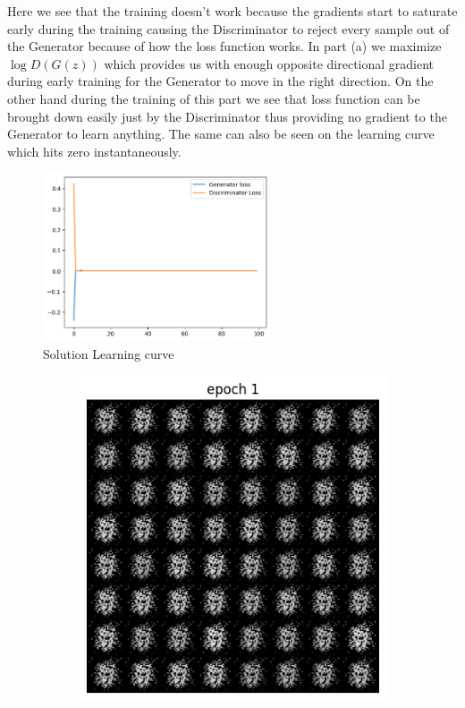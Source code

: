 \documentclass[a4paper]{article}
\theoremstyle{definition}
\newenvironment{soln}{
	\leavevmode\color{blue}\ignorespaces
}{}
\begin{document}
\begin{enumerate} [label=(\alph*)]
		\begin{soln}  
                Here we see that the training doesn't work because the gradients start to saturate early during the training causing the Discriminator to reject every sample out of the Generator because of how the loss function works. In part (a) we maximize $\log{D(G(z))}$ which provides us with enough opposite directional gradient during early training for the Generator to move in the right direction. On the other hand during the training of this part we see that loss function can be brought down easily just by the Discriminator thus providing no gradient to the Generator to learn anything. The same can also be seen on the learning curve which hits zero instantaneously. 
                \begin{figure}[H]
    			\centering
    			\includegraphics[width=0.6\textwidth]{Images/Q1/Q1b_train.png}
    			\caption{Solution Learning curve}
    			\label{fig:gan_q1b_loss}
    		\end{figure}
                \begin{figure}[H]
    			\centering
    			\begin{subfigure}[b]{0.3\textwidth}
    				\centering
    				\includegraphics[width=\textwidth]{Images/Q1/Q1b_1.png}

\end{subfigure}
\end{figure}
\end{soln}
\end{enumerate}
\end{document}
